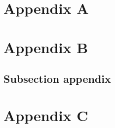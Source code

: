 \begin{spacing}{1}
\RaggedRight
























\begin{appendices}
  \chapter{Appendix A}
  
  
  \chapter{Appendix B}
  \section{Subsection appendix}
  
  \chapter{Appendix C}
  
\end{appendices}



\end{spacing}
